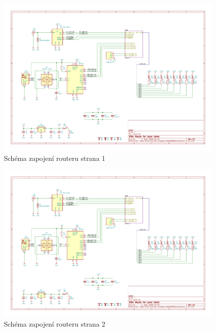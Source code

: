 \begin{landscape}
    \begin{figure}[h]
        \centering
        \includegraphics[page=1, height=\textwidth]{sch/router}
        \caption{Schéma zapojení routeru strana 1}
    \end{figure}
\end{landscape}
\begin{landscape}
    \begin{figure}[h]
        \centering
        \includegraphics[page=2, height=\textwidth]{sch/router}
        \caption{Schéma zapojení routeru strana 2}
    \end{figure}
\end{landscape}
